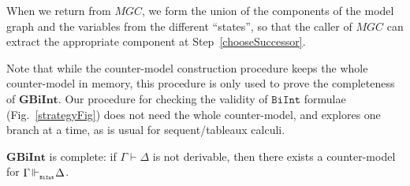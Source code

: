 \documentclass{llncs}
\numberwithin{equation}{section}
\newcommand{\Lg}[1]{\mathtt{#1}}
\newcommand{\sequent}{\vdash}
\newcommand {\BiInt}{
        \Lg{BiInt}
}
\newcommand{\GBiInt}{\mathbf{GBiInt}}
\newcommand{\entails}{\hspace{-0.05cm}\Vdash_{_{\BiInt}}\hspace{-0.1cm}}
\begin{document}
When we return from $MGC$, we form the union of the components of the
model graph and the variables from the different ``states'', so that
the caller of $MGC$ can extract the appropriate component at
Step~\ref{chooseSuccessor}.

\begin{remark}\label{proofVsCountermodel}
Note that while the counter-model construction procedure keeps the whole counter-model in memory, this procedure is only used to prove the completeness of $\GBiInt$. Our procedure for checking the validity of $\BiInt$ formulae (Fig.~\ref{strategyFig}) does not need the whole counter-model, and explores one branch at a time, as is usual for sequent/tableaux calculi.
\end{remark}

\begin{theorem}[Completeness]
$\GBiInt$ is complete: if $\Gamma \sequent \Delta$ is not derivable, then there exists a counter-model for $\Gamma \entails \Delta$.
\end{theorem}
\end{document}
